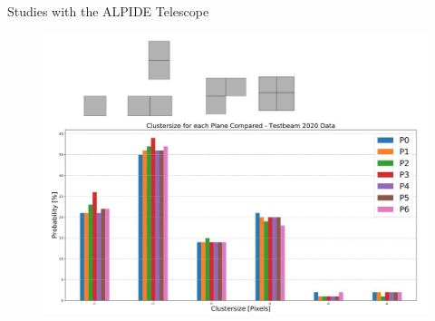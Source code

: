 \documentclass{beamer}
\begin{document}
\begin{frame}{Studies with the ALPIDE Telescope}
    \begin{figure}[H]
	\centering
	\includegraphics[width=.8\textwidth]{Feli2.jpg}
    \end{figure}
\end{frame}
\end{document}

